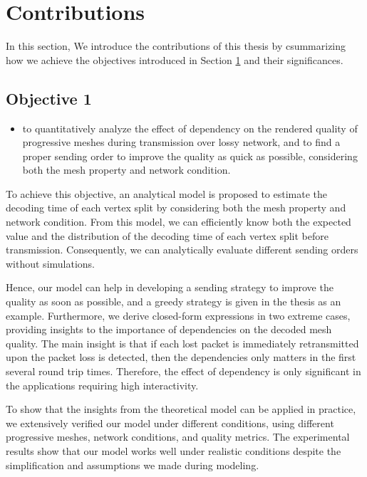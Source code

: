 \documentclass[11pt, a4paper]{report}
\begin{document}
  \section{Contributions}
  \label{s:intro:objectives}
    In this section, We introduce the contributions of this thesis by
    csummarizing how we achieve the objectives introduced in 
    Section \ref{s:intro:objectives} and their significances.
    
    \subsection{Objective 1}
    \begin{itemize}
        \item
            to quantitatively analyze the effect of dependency on 
            the rendered quality of progressive meshes 
            during transmission over lossy network, and to find
            a proper sending order to improve the quality as quick
            as possible, considering both the mesh property and network condition. 
    \end{itemize}
            
    To achieve this objective, an analytical model is proposed
    to estimate the decoding time of each vertex split by considering both
    the mesh property and network condition. 
    From this model, we can efficiently know both the expected 
    value and the distribution of the decoding time of each
    vertex split before transmission. Consequently, 
    we can analytically evaluate different sending orders without simulations.
    
    Hence, our model can help in developing a sending
    strategy to improve the quality as soon as possible,
    and a greedy strategy is given in the thesis as an example. 
    Furthermore, we derive closed-form expressions in two extreme cases,
    providing insights to the importance of dependencies on the
    decoded mesh quality. The main insight is that if each lost packet
    is immediately retransmitted upon the packet loss is detected, 
    then the dependencies only matters in the first several round trip times. 
    Therefore, the effect of dependency is only significant in the applications
    requiring high interactivity. 

    To show that the insights from the theoretical model can be applied
    in practice, we extensively verified our model under different conditions,
    using different progressive meshes, network conditions, and quality metrics. 
    The experimental results show that our model works well under realistic 
    conditions despite the simplification and assumptions we made during
    modeling.
\end{document}

